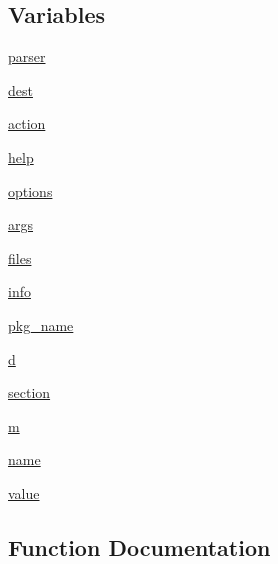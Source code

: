 \subsection*{Variables}
\begin{DoxyCompactItemize}
\item 
\hyperlink{namespacenumpy_1_1distutils_1_1npy__pkg__config_a384ce7c6279d6530c2163a47ef303f86}{parser}
\item 
\hyperlink{namespacenumpy_1_1distutils_1_1npy__pkg__config_a2e10840211b63b1be707545d801cf49d}{dest}
\item 
\hyperlink{namespacenumpy_1_1distutils_1_1npy__pkg__config_a7d9e47e796aa2aa9de5d597b95440f85}{action}
\item 
\hyperlink{namespacenumpy_1_1distutils_1_1npy__pkg__config_a57c267f8fb5a98649e83fc911d8d4a64}{help}
\item 
\hyperlink{namespacenumpy_1_1distutils_1_1npy__pkg__config_aeca8b686de2d5c9587b2d94230e6d94b}{options}
\item 
\hyperlink{namespacenumpy_1_1distutils_1_1npy__pkg__config_ad998caecc695aee68b6030a083cac42e}{args}
\item 
\hyperlink{namespacenumpy_1_1distutils_1_1npy__pkg__config_a6502f90ff397e890bbfe90ddfa203abc}{files}
\item 
\hyperlink{namespacenumpy_1_1distutils_1_1npy__pkg__config_ac057e760b79b904b0ab6146e88c148c8}{info}
\item 
\hyperlink{namespacenumpy_1_1distutils_1_1npy__pkg__config_aa13318cf4a334a4fb3c94023049ab3eb}{pkg\+\_\+name}
\item 
\hyperlink{namespacenumpy_1_1distutils_1_1npy__pkg__config_a70a37a3117c09425d291198550beef04}{d}
\item 
\hyperlink{namespacenumpy_1_1distutils_1_1npy__pkg__config_a7241ba52048f1f71984c38727b0c7b1d}{section}
\item 
\hyperlink{namespacenumpy_1_1distutils_1_1npy__pkg__config_a738d372c0faad5421faa66bc55020f5e}{m}
\item 
\hyperlink{namespacenumpy_1_1distutils_1_1npy__pkg__config_a6034536c2a07f9df487ae6aa59393339}{name}
\item 
\hyperlink{namespacenumpy_1_1distutils_1_1npy__pkg__config_a8045441b5666dac1dfb0b4af13025f04}{value}
\end{DoxyCompactItemize}


\subsection{Function Documentation}
\mbox{\label{namespacenumpy_1_1distutils_1_1npy__pkg__config_af8fc8b8c1a3b60775877f3f4437e0d38}} 
